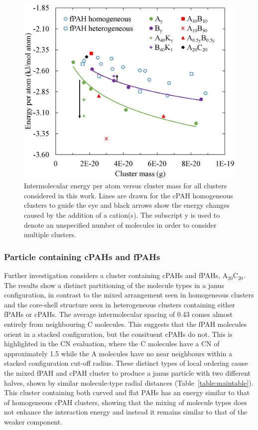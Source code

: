 %
\begin{figure}[!tbh]
\centering
\includegraphics[width=0.5\linewidth]{Figures/energies.eps}
\caption{Intermolecular energy per atom versus cluster mass for all clusters considered in this work. Lines are drawn for the cPAH homogeneous clusters to guide the eye and black arrows show the energy changes caused by the addition of a cation(s). The subscript y is used to denote an unspecified number of molecules in order to consider multiple clusters.}
\label{fig:energies}
\end{figure}
%

\subsubsection{Particle containing cPAHs and fPAHs}
Further investigation considers a cluster containing cPAHs and fPAHs, $\text{A}_{\text{20}}\text{C}_{\text{20}}$. The results show a distinct partitioning of the molecule types in a janus configuration, in contrast to the mixed arrangement seen in homogeneous clusters and the core-shell structure seen in heterogeneous clusters containing either fPAHs or cPAHs. The average intermolecular spacing of 0.43 comes almost entirely from neighbouring C molecules. This suggests that the fPAH molecules orient in a stacked configuration, but the consituent cPAHs do not. This is highlighted in the CN evaluation, where the C molecules have a CN of approximately 1.5 while the A molecules have no near neighbours within a stacked configuration cut-off radius. These distinct types of local ordering cause the mixed fPAH and cPAH cluster to produce a janus particle with two different halves, shown by similar molecule-type radial distances (Table~\ref{table:maintable}). This cluster containing both curved and flat PAHs has an energy similar to that of homogeneous cPAH clusters, showing that the mixing of molecule types does not enhance the interaction energy and instead it remains similar to that of the weaker component.

